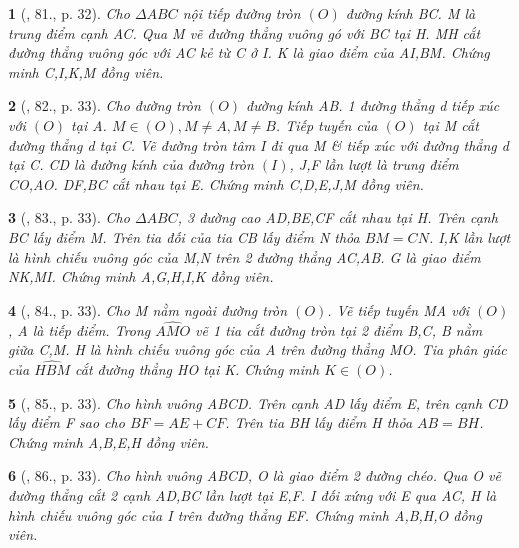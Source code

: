 \documentclass{article}
\newtheorem{baitoan}{}
\begin{document}
\begin{baitoan}[\cite{Thu_Chung_Viet_Minh_circ}, 81., p. 32]
	Cho $\Delta ABC$ nội tiếp đường tròn $(O)$ đường kính BC. M là trung điểm cạnh AC. Qua M vẽ đường thẳng vuông gó với BC tại H. MH cắt đường thẳng vuông góc với AC kẻ từ C ở I. K là giao điểm của AI,BM. Chứng minh C,I,K,M đồng viên.
\end{baitoan}

\begin{baitoan}[\cite{Thu_Chung_Viet_Minh_circ}, 82., p. 33]
	Cho đường tròn $(O)$ đường kính AB. 1 đường thẳng d tiếp xúc với $(O)$ tại A. $M\in(O),M\ne A,M\ne B$. Tiếp tuyến của $(O)$ tại M cắt đường thẳng d tại C. Vẽ đường tròn tâm I đi qua M \& tiếp xúc với đường thẳng d tại C. CD là đường kính của đường tròn $(I)$, J,F lần lượt là trung điểm CO,AO. DF,BC cắt nhau tại E. Chứng minh C,D,E,J,M đồng viên.
\end{baitoan}

\begin{baitoan}[\cite{Thu_Chung_Viet_Minh_circ}, 83., p. 33]
	Cho $\Delta ABC$, 3 đường cao AD,BE,CF cắt nhau tại H. Trên cạnh BC lấy điểm M. Trên tia đối của tia CB lấy điểm N thỏa $BM = CN$. I,K lần lượt là hình chiếu vuông góc của M,N trên 2 đường thẳng AC,AB. G là giao điểm NK,MI. Chứng minh A,G,H,I,K đồng viên.
\end{baitoan}

\begin{baitoan}[\cite{Thu_Chung_Viet_Minh_circ}, 84., p. 33]
	Cho M nằm ngoài đường tròn $(O)$. Vẽ tiếp tuyến MA với $(O)$, A là tiếp điểm. Trong $\widehat{AMO}$ vẽ 1 tia cắt đường tròn tại 2 điểm B,C, B nằm giữa C,M. H là hình chiếu vuông góc của A trên đường thẳng MO. Tia phân giác của $\widehat{HBM}$ cắt đường thẳng HO tại K. Chứng minh $K\in(O)$.
\end{baitoan}

\begin{baitoan}[\cite{Thu_Chung_Viet_Minh_circ}, 85., p. 33]
	Cho hình vuông ABCD. Trên cạnh AD lấy điểm E, trên cạnh CD lấy điểm F sao cho $BF = AE + CF$. Trên tia BH lấy điểm H thỏa $AB = BH$. Chứng minh A,B,E,H đồng viên.
\end{baitoan}

\begin{baitoan}[\cite{Thu_Chung_Viet_Minh_circ}, 86., p. 33]
	Cho hình vuông ABCD, O là giao điểm 2 đường chéo. Qua O vẽ đường thẳng cắt 2 cạnh AD,BC lần lượt tại E,F. I đối xứng với E qua AC, H là hình chiếu vuông góc của I trên đường thẳng EF. Chứng minh A,B,H,O đồng viên.
\end{baitoan}
\end{document}
